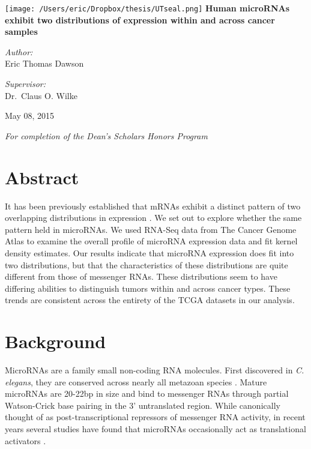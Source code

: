 \documentclass[12pt]{report}
\begin{document}
\begin{titlepage}
\begin{center}
 \texttt{[image: /Users/eric/Dropbox/thesis/UTseal.png]}
 \vfill
 \Huge \textbf{Human microRNAs exhibit two distributions of expression within and across cancer samples}
 \vfill
\noindent
\begin{minipage}[t]{0.4\textwidth}
\begin{flushleft} \large
\emph{Author:}\\
Eric Thomas Dawson
\end{flushleft}
\end{minipage}%
\begin{minipage}[t]{0.4\textwidth}
\begin{flushright} \large
\emph{Supervisor:} \\
Dr.~Claus O. Wilke
\end{flushright}
\end{minipage}
\vfill
\large May 08, 2015

\large \textit{For completion of the Dean's Scholars Honors Program}
\end{center}
\vfill

\vfill

\end{titlepage}





\section*{Abstract}
It has been previously established that mRNAs exhibit a distinct pattern of two overlapping distributions in expression \cite{Hebenstreit2011}.
We set out to explore whether the same pattern held in microRNAs.
We used RNA-Seq data from The Cancer Genome Atlas to examine the overall profile of microRNA expression data and fit kernel density estimates.
Our results indicate that microRNA expression does fit into two
distributions, but that the characteristics of these distributions are quite different from those of messenger RNAs. These distributions  seem to have differing abilities
to distinguish tumors within and across cancer types. These trends are consistent across the entirety of the TCGA datasets in our analysis.

\section*{Background}
MicroRNAs are a family small non-coding RNA molecules. First discovered in \emph{C. elegans},
they are conserved across nearly all metazoan species \cite{Ambros2004}.
Mature microRNAs are 20-22bp in size and bind to messenger RNAs through partial 
Watson-Crick base pairing in the 3' untranslated region. While canonically thought of as post-transcriptional 
repressors of messenger RNA activity, in recent years several studies have found 
that microRNAs occasionally act as translational activators \cite{Hammond2006, Gartel2008}.
\end{document}
